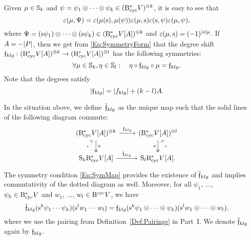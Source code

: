 \documentclass[\MainFolder/Text.tex]{subfiles}
\begin{document}
Given $\mu\in \mathbb{S}_k$ and $\psi = \psi_1 \otimes \dotsb \otimes \psi_k \in (\mathrm{B}_{\mathrm{cyc}}^* V)^{\otimes k}$, it is easy to see that
$$ \varepsilon(\mu, \Psi) = \varepsilon(\mu(\mathrm{s}),\mu(\psi)) \varepsilon(\mu,\mathrm{s})\varepsilon(\mathrm{s},\psi)\varepsilon(\mu,\psi), $$
where $\Psi = (\mathrm{s} \psi_1) \otimes \dotsb \otimes (\mathrm{s} \psi_k) \in (\mathrm{B}_{\mathrm{cyc}}^* V[A])^{\otimes k}$ and $\varepsilon(\mu,\mathrm{s}) = (-1)^{|s|\mu}$. If $A= - |P|$, then we get from \eqref{Eq:SymmetryForm} that the degree shift $\mathfrak{f}_{klg}: (\mathrm{B}_{\mathrm{cyc}}^* V [A])^{\otimes k} \rightarrow (\mathrm{B}_{\mathrm{cyc}}^* V[A])^{\otimes l}$ has the following symmetries:
\begin{equation}\label{Eq:SymMap}
\forall \mu \in \mathbb{S}_k, \eta\in \mathbb{S}_l: \quad \eta \circ \mathfrak{f}_{klg} \circ \mu = \mathfrak{f}_{klg}.
\end{equation}
Note that the degrees satisfy
\begin{equation}\label{Eq:DegDegShift}
|\mathfrak{f}_{klg}| = |f_{klg}| + (k-l) A.
\end{equation}

\begin{Remark}\label{Rem:SymMaps}
In the situation above, we define~$\tilde{\mathfrak{f}}_{klg}$ as the unique map such that the solid lines of the following diagram commute:    
$$\begin{tikzcd}
(\DBCyc V[A])^{\otimes k} \arrow{r}{\HTP_{klg}} \arrow[two heads]{d}{\pi} & (\DBCyc V[A])^{\otimes l} \arrow[two heads,swap]{d}{\pi}\\
\arrow[bend left,dotted]{u}{\iota}\Sym_k \DBCyc V[A] \arrow{r}{\tilde{\HTP}_{klg}} & \Sym_l \DBCyc V[A].\arrow[bend right,swap,dotted]{u}{\iota}
\end{tikzcd}$$
The symmetry condition \eqref{Eq:SymMap} provides the existence of $\tilde{\mathfrak{f}}_{klg}$ and implies commutativity of the dotted diagram as well. Moreover, for all $\psi_1$, $\dotsc$, $\psi_k \in \mathrm{B}_{\mathrm{cyc}}^* V$ and $w_1$, $\dotsc$, $w_l\in \mathrm{B}^{\mathrm{cyc}} V$, we have 
$$ \tilde{\mathfrak{f}}_{klg}(\mathrm{s}^k \psi_1\cdots \psi_k)(\mathrm{s}^l w_1\cdots w_l) = \mathfrak{f}_{klg}(\mathrm{s}^k \psi_1 \otimes \dotsb \otimes \psi_k)(\mathrm{s}^l w_1 \otimes \dotsb\otimes w_l), $$
where we use the pairing from Definition~\ref{Def:Pairings} in Part~I. We denote $\tilde{\mathfrak{f}}_{klg}$ again by $\mathfrak{f}_{klg}$.
\end{Remark}
\end{document}
